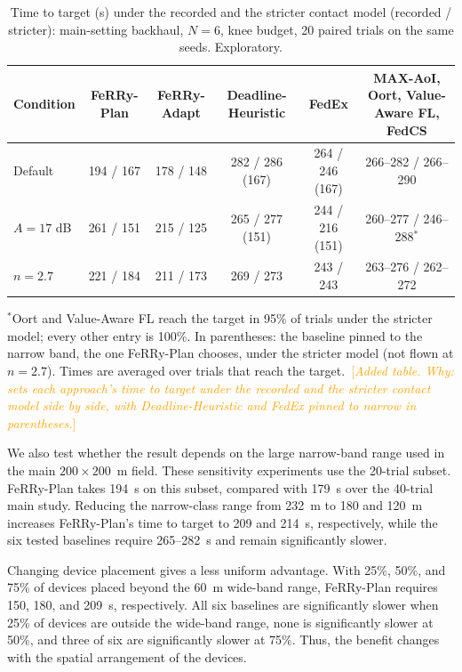 \documentclass[conference]{IEEEtran}
\newcommand{\sysname}{FeRRy}
\newcommand{\changenote}[1]{\textcolor{orange}{\,[\emph{#1}]}}
\begin{document}
\begin{table}[t]
\centering
\color{blue}
\caption{Time to target (s) under the recorded and the stricter contact model
(recorded / stricter): main-setting backhaul, \(N=6\), knee budget, 20 paired
trials on the same seeds. Exploratory.}
\label{tab:session}
\small
\setlength{\tabcolsep}{5pt}

\begin{tabular}{lccccc}
\hline
\textbf{Condition} &
\textbf{\sysname{}-Plan} &
\textbf{\sysname{}-Adapt} &
\textbf{Deadline-Heuristic} &
\textbf{FedEx} &
\textbf{MAX-AoI, Oort, Value-Aware FL, FedCS} \\
\hline
Default & 194 / 167 & 178 / 148 & 282 / 286 (167) & 264 / 246 (167) & 266--282 / 266--290 \\
\(A=17\) dB & 261 / 151 & 215 / 125 & 265 / 277 (151) & 244 / 216 (151) & 260--277 / 246--288\(^{\ast}\) \\
\(n=2.7\) & 221 / 184 & 211 / 173 & 269 / 273 & 243 / 243 & 263--276 / 262--272 \\
\hline
\end{tabular}

\vspace{2pt}
\footnotesize
\(^{\ast}\)Oort and Value-Aware FL reach the target in 95\% of trials under the
stricter model; every other entry is 100\%. In parentheses: the baseline pinned
to the narrow band, the one \sysname{}-Plan chooses, under the stricter model (not
flown at \(n=2.7\)). Times are averaged over trials that reach the target. \changenote{Added table. Why: sets each approach's time to target under the recorded and the stricter contact model side by side, with Deadline-Heuristic and FedEx pinned to narrow in parentheses.}
\end{table}

We also test whether the result depends on the large narrow-band range used in
the main \(200\times200\)~m field. These sensitivity experiments use the
20-trial subset. \sysname{}-Plan takes 194~s on this subset, compared with
179~s over the 40-trial main study. Reducing the narrow-class range from
232~m to 180 and 120~m increases \sysname{}-Plan's time to target to 209 and
214~s, respectively, while the six tested baselines require 265--282~s and
remain significantly slower.

Changing device placement gives a less uniform advantage. With 25\%, 50\%, and
75\% of devices placed beyond the 60~m wide-band range, \sysname{}-Plan
requires 150, 180, and 209~s, respectively. All six baselines are significantly
slower when 25\% of devices are outside the wide-band range, none is
significantly slower at 50\%, and three of six are significantly slower at
75\%. Thus, the benefit changes with the spatial arrangement of the devices.
\end{document}

